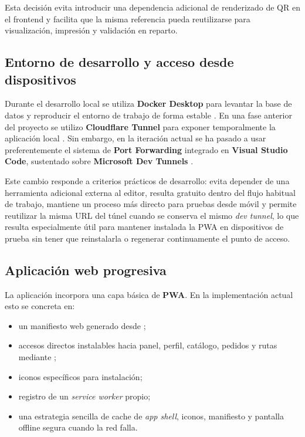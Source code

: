 Esta decisión evita introducir una dependencia adicional de renderizado de QR en el frontend y facilita que la misma referencia pueda reutilizarse para visualización, impresión y validación en reparto.

\subsection{Entorno de desarrollo y acceso desde dispositivos}

Durante el desarrollo local se utiliza \textbf{Docker Desktop} para levantar la base de datos y reproducir el entorno de trabajo de forma estable \citep{dockerdocs2026}. En una fase anterior del proyecto se utilizo \textbf{Cloudflare Tunnel} para exponer temporalmente la aplicación local \citep{cloudflaretunnel2026}. Sin embargo, en la iteración actual se ha pasado a usar preferentemente el sistema de \textbf{Port Forwarding} integrado en \textbf{Visual Studio Code}, sustentado sobre \textbf{Microsoft Dev Tunnels} \citep{vscodeportforwarding2026,microsoftdevtunnelsfaq2026}.

Este cambio responde a criterios prácticos de desarrollo: evita depender de una herramienta adicional externa al editor, resulta gratuito dentro del flujo habitual de trabajo, mantiene un proceso más directo para pruebas desde móvil y permite reutilizar la misma URL del túnel cuando se conserva el mismo \textit{dev tunnel}, lo que resulta especialmente útil para mantener instalada la PWA en dispositivos de prueba sin tener que reinstalarla o regenerar continuamente el punto de acceso.

\subsection{Aplicación web progresiva}

La aplicación incorpora una capa básica de \textbf{PWA}. En la implementación actual esto se concreta en:

\begin{itemize}
    \item un manifiesto web generado desde ;
    \item accesos directos instalables hacia panel, perfil, catálogo, pedidos y rutas mediante ;
    \item iconos específicos para instalación;
    \item registro de un \textit{service worker} propio;
    \item una estrategia sencilla de cache de \textit{app shell}, iconos, manifiesto y pantalla offline segura cuando la red falla.
\end{itemize}

